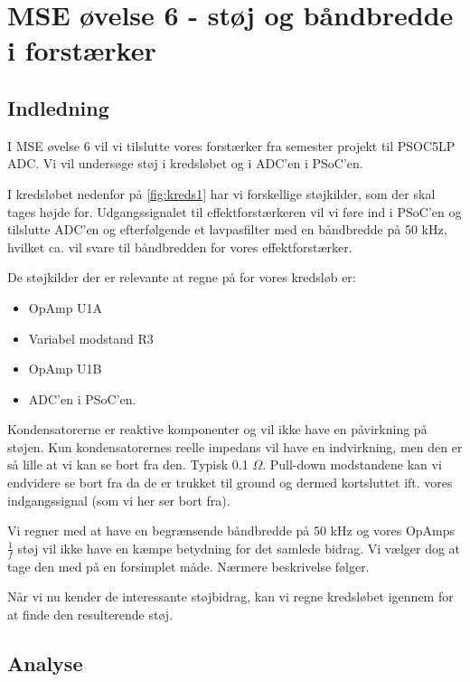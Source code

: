 \documentclass[a4paper, 11pt, article,oneside,openany]{memoir} %
\begin{document}
	
\chapter{MSE øvelse 6 - støj og båndbredde i forstærker}

\section{Indledning}
I MSE øvelse 6 vil vi tilslutte vores forstærker fra semester projekt til PSOC5LP ADC. Vi vil undersøge støj i kredsløbet og i ADC'en i PSoC'en.

I kredsløbet nedenfor på \cref{fig:kreds1} har vi forskellige støjkilder, som der skal tages højde for. Udgangssignalet til effektforstærkeren vil vi føre ind i PSoC'en og tilslutte ADC'en og efterfølgende et lavpasfilter med en båndbredde på 50 kHz, hvilket ca. vil svare til båndbredden for vores effektforstærker.

De støjkilder der er relevante at regne på for vores kredsløb er:
\begin{itemize}
	\item OpAmp U1A
	\item Variabel modstand R3
	\item OpAmp U1B
	\item ADC'en i PSoC'en.	
\end{itemize}

Kondensatorerne er reaktive komponenter og vil ikke have en påvirkning på støjen. Kun kondensatorernes reelle impedans vil have en indvirkning, men den er så lille at vi kan se bort fra den. Typisk 0.1 $\Omega$.
Pull-down modstandene kan vi endvidere se bort fra da de er trukket til ground og dermed kortsluttet ift. vores indgangssignal (som vi her ser bort fra). 

Vi regner med at have en begrænsende båndbredde på 50 kHz og vores OpAmps $\frac{1}{f}$ støj vil ikke have en kæmpe betydning for det samlede bidrag. Vi vælger dog at tage den med på en forsimplet måde. Nærmere beskrivelse følger.

Når vi nu kender de interessante støjbidrag, kan vi regne kredsløbet igennem for at finde den resulterende støj.


\section{Analyse}
\end{document}
